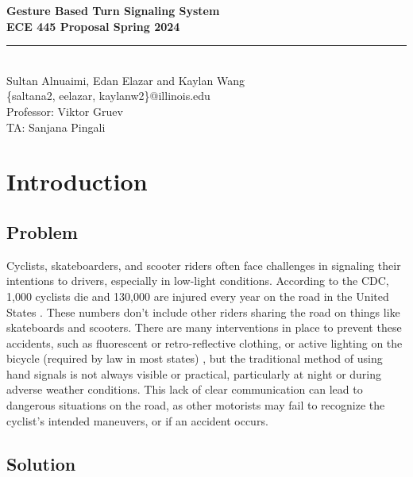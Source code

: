 \documentclass[12pt]{article}
\begin{document}
\begin{titlepage}
\centering
{}
{\LARGE\textbf{Gesture Based Turn Signaling System }}\\[1cm] 
{\large\textbf{ECE 445 Proposal Spring 2024}}\\[0.3cm]
\rule{\textwidth}{1pt}\\
{\Large Sultan Alnuaimi, Edan Elazar and Kaylan Wang}\\[0.5cm] 
{\small \{saltana2, eelazar, kaylanw2\}@illinois.edu}\\[0.5cm] 
{\small Professor: Viktor Gruev}\\[0.5cm]
{\small TA: Sanjana Pingali}\\[1cm]

\end{titlepage} 

\tableofcontents 
\newpage
\section{Introduction}
\subsection{Problem}
Cyclists, skateboarders, and scooter riders often face 
challenges in signaling their intentions to drivers,
especially in low-light conditions. According to the CDC, 
1,000 cyclists die and 130,000 are injured every year on 
the road in the United States \cite{CDC2024BicycleSafety}. 
These numbers don’t include other riders sharing the road on 
things like skateboards and scooters. There are many interventions 
in place to prevent these accidents, such as fluorescent or 
retro-reflective clothing, or active lighting on the bicycle 
(required by law in most states) \cite{CDC2024BicycleSafety}, 
but the traditional method of using hand signals is not always 
visible or practical, particularly at night or during adverse 
weather conditions. This lack of clear communication can lead 
to dangerous situations on the road, as other motorists may 
fail to recognize the cyclist's intended maneuvers, or if an 
accident occurs.

\subsection{Solution}
\end{document}

